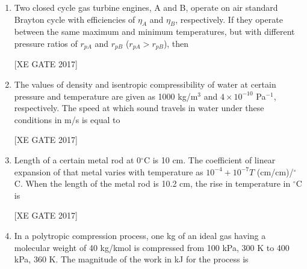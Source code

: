 \documentclass[journal,12pt,onecolumn]{IEEEtran}
\theoremstyle{remark}
\begin{document}
\begin{enumerate}
\begin{enumerate}
\end{enumerate}


\item Two closed cycle gas turbine engines, A and B, operate on air standard Brayton cycle with efficiencies of $\eta_A$ and $\eta_B$, respectively. If they operate between the same maximum and minimum temperatures, but with different pressure ratios of $r_{pA}$ and $r_{pB}$ ($r_{pA} > r_{pB}$), then  

\hfill [XE GATE 2017]

\begin{enumerate}
\end{enumerate}


\item The values of density and isentropic compressibility of water at certain pressure and temperature are given as 1000 kg/m$^3$ and $4 \times 10^{-10}$ Pa$^{-1}$, respectively. The speed at which sound travels in water under these conditions in m/s is equal to  

\hfill [XE GATE 2017]


\item Length of a certain metal rod at 0$^\circ$C is 10 cm. The coefficient of linear expansion of that metal varies with temperature as $10^{-4} + 10^{-7}T$ (cm/cm)/$^\circ$C. When the length of the metal rod is 10.2 cm, the rise in temperature in $^\circ$C is  

\hfill [XE GATE 2017]


\item In a polytropic compression process, one kg of an ideal gas having a molecular weight of 40 kg/kmol is compressed from 100 kPa, 300 K to 400 kPa, 360 K. The magnitude of the work in kJ for the process is  


\end{enumerate}
\end{document}

